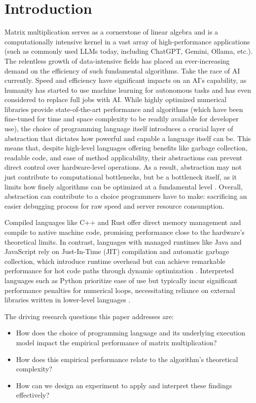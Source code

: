 \documentclass[11pt, a4paper, titlepage]{scrartcl}
\begin{document}
\section{Introduction}
Matrix multiplication serves as a cornerstone of linear algebra and is a computationally intensive kernel in a vast array of high-performance applications (such as commonly used LLMs today, including ChatGPT, Gemini, Ollama, etc.). The relentless growth of data-intensive fields has placed an ever-increasing demand on the efficiency of such fundamental algorithms. Take the race of AI currently. Speed and efficiency have significant impacts on an AI’s capability, as humanity has started to use machine learning for autonomous tasks and has even considered to replace full jobs with AI. While highly optimized numerical libraries provide state-of-the-art performance and algorithms (which have been fine-tuned for time and space complexity to be readily available for developer use), the choice of programming language itself introduces a crucial layer of abstraction that dictates how powerful and capable a language itself can be. This means that, despite high-level languages offering benefits like garbage collection, readable code, and ease of method applicability, their abstractions can prevent direct control over hardware-level operations. As a result, abstraction may not just contribute to computational bottlenecks, but be a bottleneck itself, as it limits how finely algorithms can be optimized at a fundamental level \autocite{Colburn2007}. Overall, abstraction can contribute to a choice programmers have to make: sacrificing an easier debugging process for raw speed and server resource consumption.

Compiled languages like C++ and Rust offer direct memory management and compile to native machine code, promising performance close to the hardware's theoretical limits. In contrast, languages with managed runtimes like Java and JavaScript rely on Just-In-Time (JIT) compilation and automatic garbage collection, which introduce runtime overhead but can achieve remarkable performance for hot code paths through dynamic optimization \autocite{Lin2021}. Interpreted languages such as Python prioritize ease of use but typically incur significant performance penalties for numerical loops, necessitating reliance on external libraries written in lower-level languages \autocite{Luo2021}.

The driving research questions this paper addresses are: 
\begin{itemize}
    \item How does the choice of programming language and its underlying execution model impact the empirical performance of matrix multiplication?
    \item How does this empirical performance relate to the algorithm's theoretical complexity?
    \item How can we design an experiment to apply and interpret these findings effectively?
\end{itemize}
\end{document}
